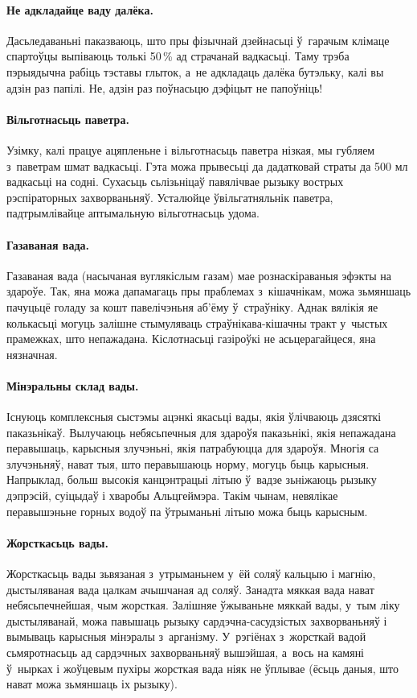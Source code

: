 \paragraph{Не адкладайце ваду далёка.}
Дасьледаваньні паказваюць, што пры фізычнай дзейнасьці ў~гарачым клімаце спартоўцы выпіваюць толькі 50\,\% ад страчанай вадкасьці. Таму трэба пэрыядычна рабіць тэставы глыток, а~не адкладаць далёка бутэльку, калі вы адзін раз папілі. Не, адзін раз поўнасьцю дэфіцыт не папоўніць!

\paragraph{Вільготнасьць паветра.}
Узімку, калі працуе ацяпленьне і вільготнасьць паветра нізкая, мы губляем з~паветрам шмат вадкасьці. Гэта можа прывесьці да дадатковай страты да 500 мл вадкасьці на содні. Сухасьць сьлізьніцаў павялічвае рызыку вострых рэспіраторных захворваньняў. Усталюйце ўвільгатняльнік паветра, падтрымлівайце аптымальную вільготнасьць удома.

\paragraph{Газаваная вада.}
Газаваная вада (насычаная вуглякіслым газам) мае рознаскіраваныя эфэкты на здароўе. Так, яна можа дапамагаць пры праблемах з~кішачнікам, можа зьмяншаць пачуцьцё голаду за кошт павелічэньня аб'ёму ў~страўніку. Аднак вялікія яе колькасьці могуць залішне стымуляваць страўнікава-кішачны тракт у~чыстых прамежках, што непажадана. Кіслотнасьці газіроўкі не асьцерагайцеся, яна нязначная.

\paragraph{Мінэральны склад вады.}
Існуюць комплексныя сыстэмы ацэнкі якасьці вады, якія ўлічваюць дзясяткі паказьнікаў. Вылучаюць небясьпечныя для здароўя паказьнікі, якія непажадана перавышаць, карысныя злучэньні, якія патрабуюцца для здароўя. Многія са злучэньняў, нават тыя, што перавышаюць норму, могуць быць карысныя. Напрыклад, больш высокія канцэнтрацыі літыю ў~вадзе зьніжаюць рызыку дэпрэсій, суіцыдаў і хваробы Альцгеймэра. Такім чынам, невялікае перавышэньне горных водоў па ўтрыманьні літыю можа быць карысным.

\paragraph{Жорсткасьць вады.}
Жорсткасьць вады зьвязаная з~утрыманьнем у~ёй соляў кальцыю і магнію, дыстыляваная вада цалкам ачышчаная ад соляў. Занадта мяккая вада нават небясьпечнейшая, чым жорсткая. Залішняе ўжываньне мяккай вады, у~тым ліку дыстыляванай, можа павышаць рызыку сардэчна-сасудзістых захворваньняў і вымываць карысныя мінэралы з~арганізму. У~рэгіёнах з~жорсткай вадой сьмяротнасьць ад сардэчных захворваньняў вышэйшая, а~вось на камяні ў~нырках і жоўцевым пухіры жорсткая вада ніяк не ўплывае (ёсьць даныя, што нават можа зьмяншаць іх рызыку).


